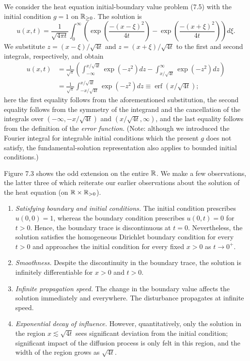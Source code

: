 \begin{example}[][7.9]
    We consider the heat equation initial-boundary value problem (7.5) with the initial condition $g = 1$ on $\mathbb{R}_{\geq 0}$. The solution is
    \[u(x, t) = \frac{1}{\sqrt{4\pi t}} \int_0^{\infty} \left(\exp\left(\frac{-(x - \xi)^2}{4t}\right) - \exp\left(\frac{-(x + \xi)^2}{4t}\right)\right) d\xi.\]
    We substitute $z = (x - \xi)/\sqrt{4t}$ and $z = (x + \xi)/\sqrt{4t}$ to the first and second integrals, respectively, and obtain
    \begin{align*}
        u(x, t) &= \frac{1}{\sqrt{\pi}} \left(\int_{-\infty}^{x/\sqrt{4t}} \exp(-z^2) dz - \int_{x/\sqrt{4t}}^{\infty} \exp(-z^2) dz\right) \\
        &= \frac{1}{\sqrt{\pi}} \int_{-x/\sqrt{4t}}^{x/\sqrt{4t}} \exp(-z^2) dz \equiv \operatorname{erf}(x/\sqrt{4t});
    \end{align*}
    here the first equality follows from the aforementioned substitution, the second equality follows from the symmetry of the integrand and the cancellation of the integrals over $(-\infty, -x/\sqrt{4t})$ and $(x/\sqrt{4t}, \infty)$, and the last equality follows from the definition of the \textit{error function}. (Note: although we introduced the Fourier integral for integrable initial conditions which the present $g$ does not satisfy, the fundamental-solution representation also applies to bounded initial conditions.)

    Figure 7.3 shows the odd extension on the entire $\mathbb{R}$. We make a few observations, the latter three of which reiterate our earlier observations about the solution of the heat equation (on $\mathbb{R} \times \mathbb{R}_{>0}$).


    \begin{enumerate}
        \item \textit{Satisfying boundary and initial conditions.} The initial condition prescribes $u(0, 0) = 1$, whereas the boundary condition prescribes $u(0, t) = 0$ for $t > 0$. Hence, the boundary trace is discontinuous at $t = 0$. Nevertheless, the solution satisfies the homogeneous Dirichlet boundary condition for every $t > 0$ and approaches the initial condition for every fixed $x > 0$ as $t \to 0^+$.
        \item \textit{Smoothness.} Despite the discontinuity in the boundary trace, the solution is infinitely differentiable for $x > 0$ and $t > 0$.
        \item \textit{Infinite propagation speed.} The change in the boundary value affects the solution immediately and everywhere. The disturbance propagates at infinite speed.
        \item \textit{Exponential decay of influence.} However, quantitatively, only the solution in the region $x \lesssim \sqrt{4t}$ sees significant deviation from the initial condition; significant impact of the diffusion process is only felt in this region, and the width of the region grows as $\sqrt{4t}$.
    \end{enumerate}
\end{example}

